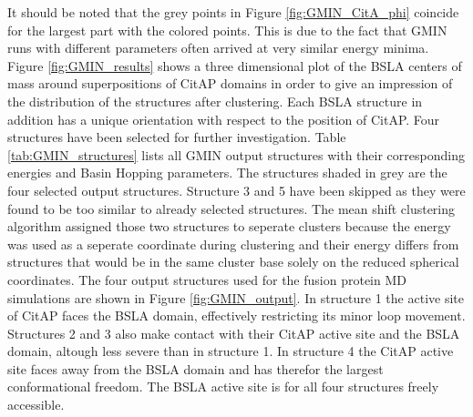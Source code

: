 \documentclass[english, a4paper, 12pt, titlepage, draft]{article}
\begin{document}
It should be noted that the grey points in Figure \ref{fig:GMIN_CitA_phi} coincide for the largest part with the colored points.
This is due to the fact that GMIN runs with different parameters often arrived at very similar energy minima.
Figure \ref{fig:GMIN_results} shows a three dimensional plot of the BSLA centers of mass around superpositions of CitAP domains in order to give an impression of the distribution of the structures after clustering.
Each BSLA structure in addition has a unique orientation with respect to the position of CitAP.
Four structures have been selected for further investigation.
Table \ref{tab:GMIN_structures} lists all GMIN output structures with their corresponding energies and Basin Hopping parameters.
The structures shaded in grey are the four selected output structures.
Structure 3 and 5 have been skipped as they were found to be too similar to already selected structures.
The mean shift clustering algorithm assigned those two structures to seperate clusters because the energy was used as a seperate coordinate during clustering and their energy differs from structures that would be in the same cluster base solely on the reduced spherical coordinates.
The four output structures used for the fusion protein MD simulations are shown in Figure \ref{fig:GMIN_output}.
In structure 1 the active site of CitAP faces the BSLA domain, effectively restricting its minor loop movement.
Structures 2 and 3 also make contact with their CitAP active site and the BSLA domain, altough less severe than in structure 1.
In structure 4 the CitAP active site faces away from the BSLA domain and has therefor the largest conformational freedom.
The BSLA active site is for all four structures freely accessible.
\end{document}
